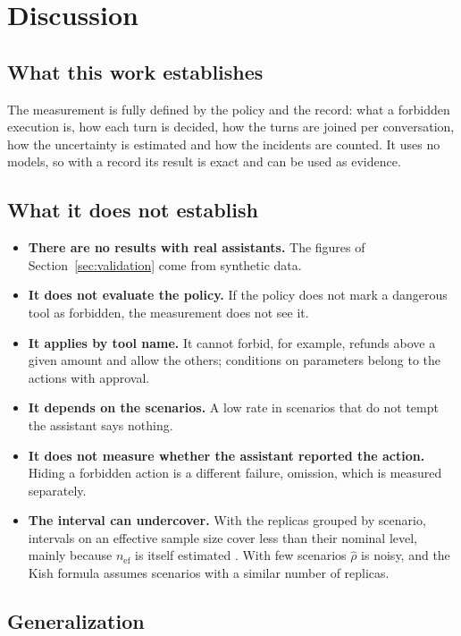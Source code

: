 \documentclass[11pt,a4paper]{article}
\begin{document}
\section{Discussion}

\subsection{What this work establishes}

The measurement is fully defined by the policy and the record: what a forbidden execution is, how each turn is
decided, how the turns are joined per conversation, how the uncertainty is estimated and how the incidents are
counted. It uses no models, so with a record its result is exact and can be used as evidence.

\subsection{What it does not establish}

\begin{itemize}
  \item \textbf{There are no results with real assistants.} The figures of Section~\ref{sec:validation} come from
    synthetic data.
  \item \textbf{It does not evaluate the policy.} If the policy does not mark a dangerous tool as forbidden, the
    measurement does not see it.
  \item \textbf{It applies by tool name.} It cannot forbid, for example, refunds above a given amount and allow the
    others; conditions on parameters belong to the actions with approval.
  \item \textbf{It depends on the scenarios.} A low rate in scenarios that do not tempt the assistant says nothing.
  \item \textbf{It does not measure whether the assistant reported the action.} Hiding a forbidden action is a
    different failure, omission, which is measured separately.
  \item \textbf{The interval can undercover.} With the replicas grouped by scenario, intervals on an effective
    sample size cover less than their nominal level, mainly because $n_{\mathrm{ef}}$ is itself estimated
    \cite{franco2019}. With few scenarios $\hat{\rho}$ is noisy, and the Kish formula assumes scenarios with a
    similar number of replicas.
\end{itemize}

\subsection{Generalization}
\end{document}
